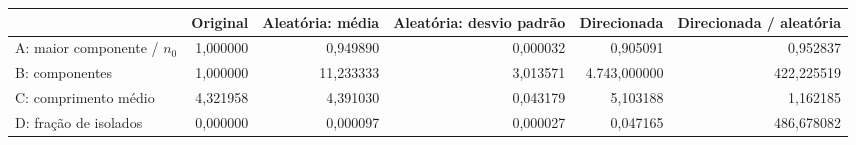 \begin{tabular}{lrrrrr}
\toprule
 & Original & Aleatória: média & Aleatória: desvio padrão & Direcionada & Direcionada / aleatória \\
\midrule
A: maior componente / $n_0$ & 1,000000 & 0,949890 & 0,000032 & 0,905091 & 0,952837 \\
B: componentes & 1,000000 & 11,233333 & 3,013571 & 4.743,000000 & 422,225519 \\
C: comprimento médio & 4,321958 & 4,391030 & 0,043179 & 5,103188 & 1,162185 \\
D: fração de isolados & 0,000000 & 0,000097 & 0,000027 & 0,047165 & 486,678082 \\
\bottomrule
\end{tabular}
